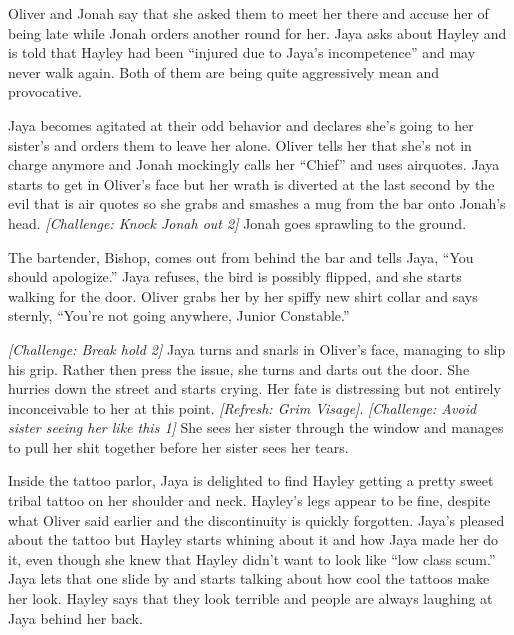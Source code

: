 Oliver and Jonah say that she asked them to meet her there and accuse her of being late while Jonah orders another round for her.  Jaya asks about Hayley and is told that Hayley had been ``injured due to Jaya's incompetence'' and may never walk again.  Both of them are being quite aggressively mean and provocative.



Jaya becomes agitated at their odd behavior and declares she's going to her sister's and orders them to leave her alone.  Oliver tells her that she's not in charge anymore and Jonah mockingly calls her ``Chief'' and uses airquotes.  Jaya starts to get in Oliver's face but her wrath is diverted at the last second by the evil that is air quotes so she grabs and smashes a mug from the bar onto Jonah's head.  \textit{{[}Challenge: Knock Jonah out 2{]}}  Jonah goes sprawling to the ground.



The bartender, Bishop, comes out from behind the bar and tells Jaya, ``You should apologize.''  Jaya refuses, the bird is possibly flipped, and she starts walking for the door.  Oliver grabs her by her spiffy new shirt collar and says sternly, ``You're not going anywhere, Junior Constable.''



\textit{{[}Challenge: Break hold 2{]}} Jaya turns and snarls in Oliver's face, managing to slip his grip.  Rather then press the issue, she turns and darts out the door.  She hurries down the street and starts crying.  Her fate is distressing but not entirely inconceivable to her at this point.   \textit{{[}Refresh: Grim Visage{]}}.  \textit{{[}Challenge: Avoid sister seeing her like this 1{]}} She sees her sister through the window and manages to pull her shit together before her sister sees her tears.



Inside the tattoo parlor, Jaya is delighted to find Hayley getting a pretty sweet tribal tattoo on her shoulder and neck.  Hayley's legs appear to be fine, despite what Oliver said earlier and the discontinuity is quickly forgotten. Jaya's pleased about the tattoo but Hayley starts whining about it and how Jaya made her do it, even though she knew that Hayley didn't want to look like ``low class scum.''  Jaya lets that one slide by and starts talking about how cool the tattoos make her look.  Hayley says that they look terrible and people are always laughing at Jaya behind her back.



